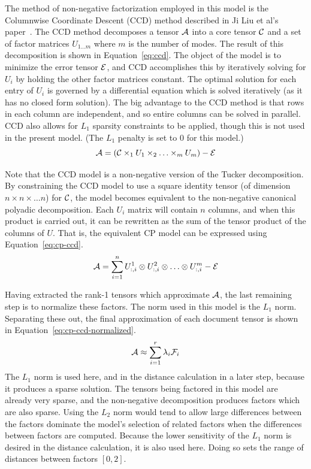 \documentclass[../ut-dissertation.tex]{subfiles}
\begin{document}
The method of non-negative factorization employed in this model is the
Columnwise Coordinate Descent (CCD) method described in Ji Liu et al's
paper~\cite{liu2012sparse}. The CCD method decomposes a tensor
$\mathcal{A}$ into a
core tensor $\mathcal{C}$ and a set of factor matrices $U_{1\ldots m}$
where $m$ is the number of modes.  The result of this decomposition is
shown in Equation~\ref{eq:ccd}.  The object of the model is to
minimize the error tensor $\mathcal{E}$, and CCD accomplishes this by
iteratively solving for $U_i$ by holding the other factor matrices
constant.  The optimal solution for each entry of $U_i$ is governed by
a differential equation which is solved iteratively (as it has no
closed form solution).  The big advantage to the CCD method is that
rows in each column are independent, and so entire columns can be
solved in parallel.  CCD also allows for $L_1$ sparsity constraints to
be applied, though this is not used in the present model.  (The $L_1$
penalty is set to 0 for this model.)  
\begin{equation}
  \label{eq:ccd}
  \mathcal{A} = (\mathcal{C} \times_1 U_1 \times_2 \ldots \times_m U_m) - \mathcal{E}
\end{equation}

Note that the CCD model is a non-negative version of the Tucker
decomposition. By constraining the CCD model to use a square identity
tensor (of dimension $n \times n \times \ldots n$) for
$\mathcal{C}$, the model becomes equivalent to the non-negative canonical
polyadic decomposition.  Each $U_i$ matrix will contain $n$ columns,
and when this product is carried out, it can be rewritten as the sum
of the tensor product of the columns of $U$.  That is, the equivalent
CP model can be expressed using Equation~\ref{eq:cp-ccd}.
\begin{equation}
  \label{eq:cp-ccd}
  \mathcal{A} = \displaystyle\sum_{i=1}^n U^1_{:,i} \otimes U^2_{:,i} \otimes \ldots
  \otimes U^m_{:,i} - \mathcal{E}
\end{equation}

Having extracted the rank-1 tensors which approximate $\mathcal{A}$, the
last remaining step is to normalize these factors.  The norm used in
this model is the $L_1$ norm.  Separating these out, the final
approximation of each document tensor is shown in
Equation~\ref{eq:cp-ccd-normalized}.
\begin{equation}
  \label{eq:cp-ccd-normalized}
  \mathcal{A} \approx \displaystyle\sum_{i=1}^r \lambda_i \mathcal{F}_i
\end{equation}
The $L_1$ norm is used here, and in the distance calculation in a
later step, because it produces a sparse solution.  The tensors being
factored in this model are already very sparse, and the non-negative
decomposition produces factors which are also sparse.  Using the $L_2$
norm would tend to allow large differences between the factors
dominate the model's selection of related factors when the differences
between factors are computed. Because the lower sensitivity of the
$L_1$ norm is desired in the distance calculation, it is also used
here.  Doing so sets the range of distances between factors $[0,2]$.
\end{document}
